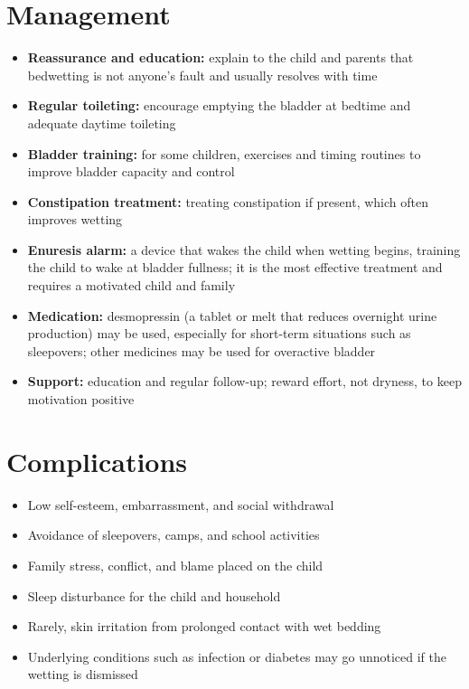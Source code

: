 \section*{Management}
\begin{itemize}
    \item \textbf{Reassurance and education:} explain to the child and parents that bedwetting is not anyone's fault and usually resolves with time
    \item \textbf{Regular toileting:} encourage emptying the bladder at bedtime and adequate daytime toileting
    \item \textbf{Bladder training:} for some children, exercises and timing routines to improve bladder capacity and control
    \item \textbf{Constipation treatment:} treating constipation if present, which often improves wetting
    \item \textbf{Enuresis alarm:} a device that wakes the child when wetting begins, training the child to wake at bladder fullness; it is the most effective treatment and requires a motivated child and family
    \item \textbf{Medication:} desmopressin (a tablet or melt that reduces overnight urine production) may be used, especially for short-term situations such as sleepovers; other medicines may be used for overactive bladder
    \item \textbf{Support:} education and regular follow-up; reward effort, not dryness, to keep motivation positive
\end{itemize}

\section*{Complications}
\begin{itemize}
    \item Low self-esteem, embarrassment, and social withdrawal
    \item Avoidance of sleepovers, camps, and school activities
    \item Family stress, conflict, and blame placed on the child
    \item Sleep disturbance for the child and household
    \item Rarely, skin irritation from prolonged contact with wet bedding
    \item Underlying conditions such as infection or diabetes may go unnoticed if the wetting is dismissed
\end{itemize}

